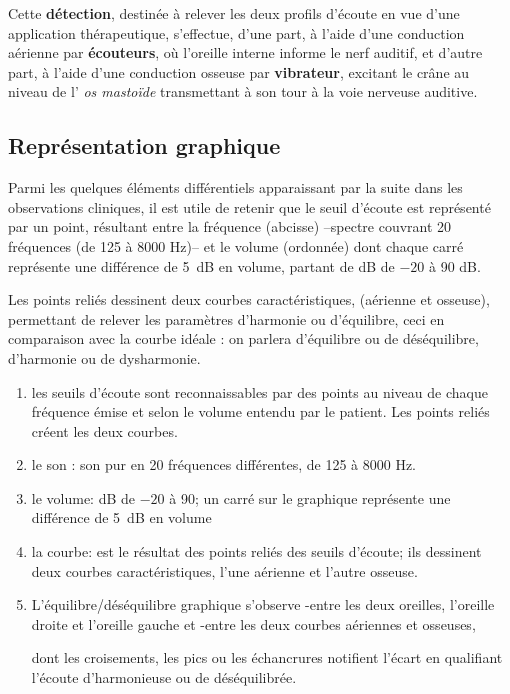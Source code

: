 Cette \textbf{détection}, destinée à relever les deux profils d'écoute
en vue d'une application thérapeutique, 
s'effectue, d'une part, à l'aide d'une
conduction aérienne par \textbf{écouteurs}, où l'oreille interne
informe le nerf auditif,  et d'autre part, à l'aide
d'une conduction osseuse par\textbf{ vibrateur}, excitant le crâne au
niveau de l'
\textit{os mastoïde} transmettant à son tour à  la voie nerveuse
auditive.

\subsection{Représentation graphique}

Parmi les quelques éléments différentiels
apparaissant par la suite dans les observations cliniques, il est utile de retenir
que le seuil d'écoute est représenté par un point, résultant entre la
fréquence (abcisse) --spectre couvrant 20
fréquences (de 125 à 8000 Hz)--   et le volume
(ordonnée) dont chaque carré représente une différence de \SI{5}{\dB} en
volume, partant de dB de $-20$ à 90 dB.


Les points reliés dessinent deux courbes caractéristiques, (aérienne
et osseuse), permettant de relever les paramètres d'harmonie ou
          d'équilibre, ceci 
 	en comparaison avec la courbe idéale : on parlera
        d'équilibre ou de
 	déséquilibre, d'harmonie ou de dysharmonie.
        
        \begin{enumerate}
 
  \item   les seuils d'écoute sont reconnaissables par des points au niveau de 
          chaque fréquence émise et selon le volume entendu par le
          patient. Les points reliés créent les deux courbes.
 	\item le son : son pur en 20 fréquences différentes, de 125 à 8000 Hz.   
 	\item le volume: dB de $-20$ à 90; un carré sur le graphique représente une différence de \SI{5}{\dB} en
 		volume 
 	\item la courbe: est le résultat des points reliés des seuils
          d'écoute; ils 
          dessinent deux courbes caractéristiques, l'une aérienne et l'autre osseuse.
         
        
      \item L'équilibre/déséquilibre graphique s'observe 
        -entre les deux oreilles, l'oreille droite et l'oreille gauche
        et 
        -entre les deux courbes aériennes et osseuses,
        
        dont les 
        croisements, les pics ou les échancrures notifient 
        l'écart en 
        qualifiant l'écoute d'harmonieuse ou de
        déséquilibrée. 
      \end{enumerate}
      
